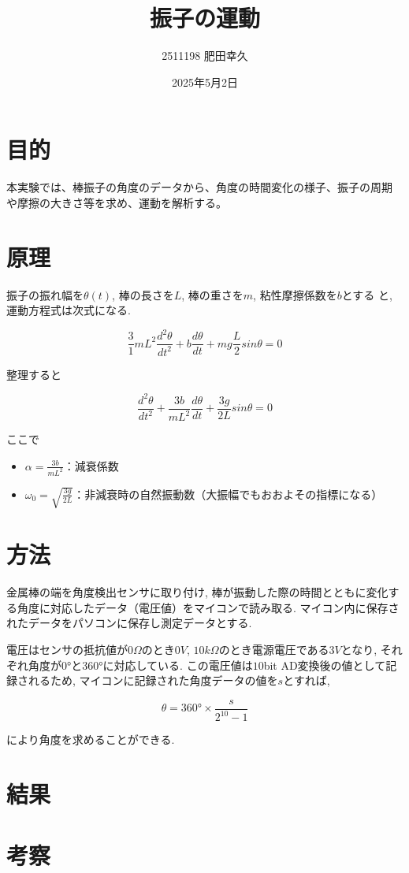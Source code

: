 \documentclass{jarticle}
\title{振子の運動}
\author{2511198 肥田幸久}
\date{2025年5月2日}
\begin{document}
\maketitle

\section{目的}

本実験では、棒振子の角度のデータから、角度の時間変化の様子、振子の周期
や摩擦の大きさ等を求め、運動を解析する。

\section{原理}

振子の振れ幅を$\theta(t)$, 棒の長さを$L$, 棒の重さを$m$, 粘性摩擦係数を$b$とする
と, 運動方程式は次式になる.

\begin{equation}
  \frac{3}{1}mL^2\frac{d^2\theta}{dt^2}+b\frac{d\theta}{dt}+mg\frac{L}{2}sin\theta=0
\end{equation}

整理すると

\begin{equation}
  \frac{d^2\theta}{dt^2}+\frac{3b}{mL^2}\frac{d\theta}{dt}+\frac{3g}{2L}sin\theta=0
\end{equation}

ここで

\begin{itemize}
  \item $\alpha=\frac{3b}{mL^2}$：減衰係数
  \item $\omega_0=\sqrt{\frac{3g}{2L}}$：非減衰時の自然振動数（大振幅でもおおよその指標になる）
\end{itemize}


\section{方法}

金属棒の端を角度検出センサに取り付け, 棒が振動した際の時間とともに変化する角度に対応したデータ（電圧値）をマイコンで読み取る.
マイコン内に保存されたデータをパソコンに保存し測定データとする.

電圧はセンサの抵抗値が$0\Omega$のとき$0V$, $10k\Omega$のとき電源電圧である$3V$となり, それ
ぞれ角度が$0°$と$360°$に対応している. この電圧値は$10$bit AD変換後の値として記
録されるため, マイコンに記録された角度データの値を$s$とすれば,

\begin{equation}
  \theta=360°\times\frac{s}{2^{10}-1}
\end{equation}

により角度を求めることができる.

\section{結果}

\section{考察}
\end{document}
